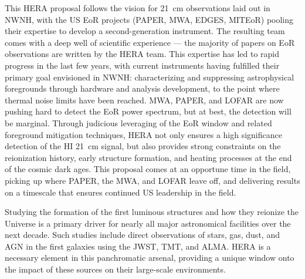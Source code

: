 \documentclass[preprint]{aastex}
\def\HI{{H{\small I }}}
\begin{document}
This HERA proposal follows the vision for 21~cm observations laid out in NWNH,
with the US EoR projects (PAPER, MWA, EDGES, MITEoR) pooling their expertise to
develop a second-generation instrument.  The resulting team comes with a deep
well of scientific experience --- the majority of papers on EoR observations
are written by the HERA team.
This expertise has led to rapid progress in the last few years, with current
instruments having fulfilled their primary goal envisioned in NWNH:
characterizing and suppressing astrophysical foregrounds through hardware and
analysis development, to the point where thermal noise limits have been
reached.  MWA, PAPER, and LOFAR are now pushing hard to detect the EoR power
spectrum, but at best, the detection will be marginal.  Through judicious
leveraging of the EoR window and related foreground mitigation techniques, HERA
not only ensures a high significance detection of the \HI 21~cm signal, but
also provides strong constraints on the reionization history,
early structure formation, and heating processes at
the end of the cosmic dark ages.
This proposal comes at an
opportune time in the field, picking up where PAPER, the MWA, and LOFAR leave
off, and delivering results on a timescale that ensures continued US leadership in the field.

Studying the formation of the first luminous structures 
and how they reionize the Universe is a primary driver for 
nearly all major astronomical facilities over the next decade.
Such studies include direct  observations of stars, gas, dust, and AGN in the
first galaxies using the JWST, TMT, and ALMA. HERA is 
a necessary element in this panchromatic arsenal, 
providing a unique window onto the impact of these sources on 
their large-scale environments.


\clearpage
\setcounter{page}{1}
\thispagestyle{empty}
%
%

%

\end{document}
